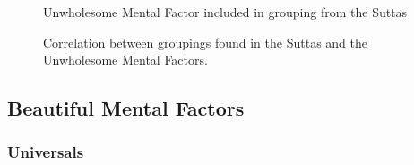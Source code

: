 \begin{figure}[H]
\begin{center}
\tm\hspace{2mm} Unwholesome Mental Factor included in grouping from the Suttas
\end{center}

\caption{Correlation between groupings found in the Suttas and the Unwholesome Mental Factors.}
\end{figure}

\subsection*{Beautiful Mental Factors}

\subsubsection*{Universals}

